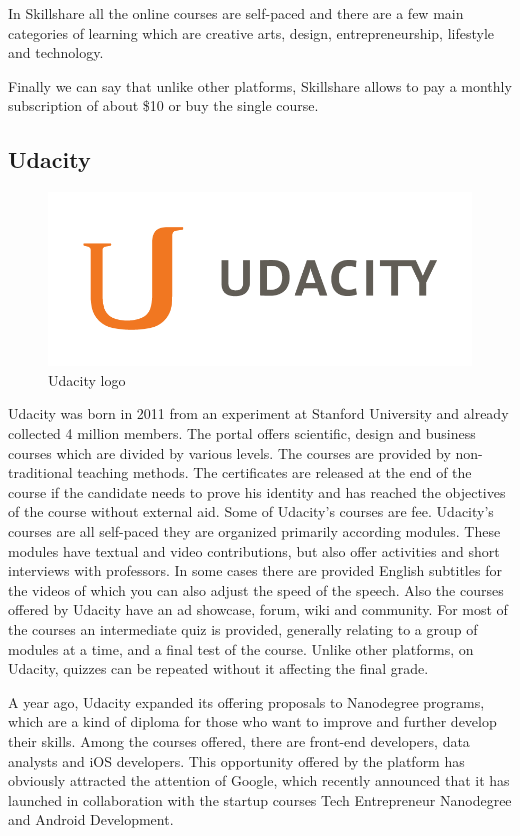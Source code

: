 In Skillshare all the online courses are self-paced and there are a few main categories of learning which are creative arts, design, entrepreneurship, lifestyle and technology.

Finally we can say that unlike other platforms, Skillshare allows to pay a monthly subscription of about \$10 or buy the single course.


\subsection{Udacity}
\label{subsec:udacity}
\begin{figure}[htb] %
 \centering
 \includegraphics[width=0.5\linewidth]{images/chapter1/udacity.png}\hfill
 \caption[Udacity logo]{Udacity logo}
 \label{fig:fourV}
\end{figure}

Udacity was born in 2011 from an experiment at Stanford University and already collected 4 million members. The portal offers scientific, design and business courses which are divided by various levels. The courses are provided by non-traditional teaching methods.
The certificates are released at the end of the course if the candidate needs to prove his identity and has reached the objectives of the course without external aid. Some of Udacity's courses are fee.
Udacity’s courses are all self-paced they are organized primarily according modules. These modules have textual and video contributions, but also offer activities and short interviews with professors. In some cases there are provided English subtitles for the videos of which you can also adjust the speed of the speech.
Also the courses offered by Udacity have an ad showcase, forum, wiki and community. For most of the courses an intermediate quiz is provided, generally relating to a group of modules at a time, and a final test of the course. Unlike other platforms, on Udacity, quizzes can be repeated without it affecting the final grade.

A year ago, Udacity expanded its offering proposals to Nanodegree programs, which are a kind of diploma for those who want to improve and further develop their skills. Among the courses offered, there are front-end developers, data analysts and iOS developers. This opportunity offered by the platform has obviously attracted the attention of Google, which recently announced that it has launched in collaboration with the startup courses Tech Entrepreneur Nanodegree and Android Development.


